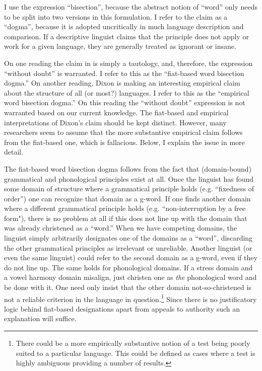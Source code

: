 \documentclass[output=paper,hidelinks]{langscibook}
\begin{document}
I use the expression ``bisection'', because the abstract notion of ``word'' only needs to be split into two versions in this formulation. I refer to the claim as a ``dogma'', because it is adopted uncritically in much language description and comparison. If a descriptive linguist claims that the principle does not apply or work for a given language, they are generally treated as ignorant or insane.

On one reading the claim in  is simply a tautology, and, therefore, the expression ``without doubt'' is warranted. I refer to this as the ``fiat-based word bisection dogma.'' On another reading, Dixon is making an interesting empirical claim about the structure of all (or most?) languages. I refer to this as the ``empirical word bisection dogma.'' On this reading the ``without doubt'' expression is not warranted based on our current knowledge. The fiat-based and empirical interpretations of Dixon's claim should be kept distinct. However, many researchers seem to assume that the more substantive empirical claim follows from the fiat-based one, which is fallacious. Below, I explain the issue in more detail.

\hspace*{-1.9pt}The fiat-based word bisection dogma follows from the fact that (domain-bound) grammatical and phonological principles exist at all. Once the linguist has found some domain of structure where a grammatical principle holds (e.g. ``fixedness of order'') one  can recognize that domain as a g-word. If one finds another domain where a different grammatical principle holds (e.g. ``non-interruption by a free form"), there is no problem at all if this does not line up with the domain that was already christened as a ``word.'' When we have competing domains, the linguist simply arbitrarily designates one of the domains as a ``word'', discarding the other grammatical principles as irrelevant or unreliable. Another linguist (or even the same linguist) could refer to the second domain as a g-word, even if they do not line up. The same holds for phonological domains. If a stress domain and a vowel harmony domain misalign, just christen one as \textit{the} phonological word and be done with it. One need only insist that the other domain not-so-christened is not a reliable criterion in the language in question.\footnote{There could be a more empirically substantive notion of a test being poorly suited to a particular language. This could be defined as cases where a test is highly ambiguous providing a number of results.} Since there is no justificatory logic behind fiat-based designations apart from appeals to authority such an explanation will suffice.
\end{document}
